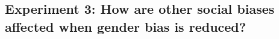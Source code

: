 \documentclass[letterpaper]{article} %
\newcommand{\goncalo}[1]
{\textcolor{orange}{{\bf}{\em #1}{\bf}}}
\begin{document}




\subsection{Experiment 3: How are other social biases affected when gender bias is reduced?}
\end{document}
